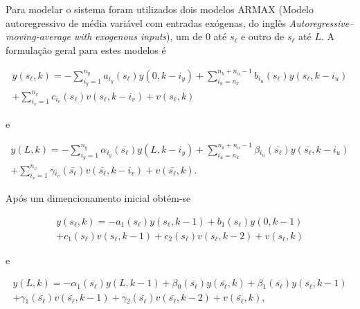 Para modelar o sistema foram utilizados dois modelos \ac{ARMAX} (Modelo
autoregressivo de média variável com entradas exógenas, do inglês
\textit{Autoregressive–moving-average with exogenous inputs}), um de \( 0 \) até
\( s_\ell \) e outro de \( s_\ell \) até \( L \). A formulação geral para estes
modelos é

\begin{equation}
	\label{eq:lpv-polynom-generic-sl}
	\begin{split}
		y(s_\ell,k) = -\sum_{i_y=1}^{n_y}a_{i_y}(s_\ell)y(0,k-i_y)
					+\sum_{i_u=n_k}^{n_k+n_u-1}b_{i_u}(s_\ell)y(s_\ell,k-i_u) \\
					+\sum_{i_v=1}^{n_v}c_{i_v}(s_\ell)v(s_\ell,k-i_v)+v(s_\ell,k)
	\end{split}
\end{equation}

e

\begin{equation}
	\label{eq:lpv-polynom-generic-L}
	\begin{split}
		y(L,k) = -\sum_{i_y=1}^{n_y}\alpha{}_{i_y}(\bar{s_\ell})y(L,k-i_y)
					+\sum_{i_u=n_k}^{n_k+n_u-1}\beta{}_{i_u}(\bar{s_\ell})y(\bar{s_\ell},k-i_u) \\
					+\sum_{i_v=1}^{n_v}\gamma{}_{i_v}(\bar{s_\ell})v(\bar{s_\ell},k-i_v)+v(\bar{s_\ell},k).
	\end{split}
\end{equation}

Após um dimencionamento inicial obtém-se

\begin{equation}
	\label{eq:lpv-polynom-sl}
	\begin{split}
		y(s_\ell,k) = -a_1(s_\ell)y(s_\ell,k-1) + b_1(s_\ell)y(0,k-1) \\
					+ c_1(s_\ell)v(s_\ell,k-1) + c_2(s_\ell)v(s_\ell,k-2)
					+ v(s_\ell,k)
	\end{split}
\end{equation}

e

\begin{equation}
	\label{eq:lpv-polynom-L}
	\begin{split}
		y(L,k) = -\alpha{}_1(\bar{s_\ell})y(L,k-1)
					+ \beta{}_0(\bar{s_\ell})y(\bar{s_\ell},k)
					+ \beta{}_1(\bar{s_\ell})y(\bar{s_\ell},k-1) \\
					+ \gamma{}_1(\bar{s_\ell})v(\bar{s_\ell},k-1)
					+ \gamma{}_2(\bar{s_\ell})v(\bar{s_\ell},k-2)
					+ v(\bar{s_\ell},k),
	\end{split}
\end{equation}

